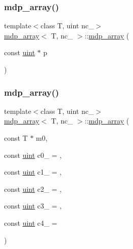 \subsubsection{\texorpdfstring{mdp\+\_\+array()}{mdp\_array()}\hspace{0.1cm}{\footnotesize\ttfamily [2/5]}}
{\footnotesize\ttfamily template$<$class T, uint nc\+\_\+$>$ \\
\hyperlink{classmdp__array}{mdp\+\_\+array}$<$ T, nc\+\_\+ $>$\+::\hyperlink{classmdp__array}{mdp\+\_\+array} (\begin{DoxyParamCaption}\item[{const \hyperlink{mdp__global__vars_8h_a91ad9478d81a7aaf2593e8d9c3d06a14}{uint} $\ast$}]{p }\end{DoxyParamCaption})\hspace{0.3cm}{\ttfamily [inline]}}

\mbox{\label{classmdp__array_abf3b0ca804544eac3be7d8e499eeb089}} 
\subsubsection{\texorpdfstring{mdp\+\_\+array()}{mdp\_array()}\hspace{0.1cm}{\footnotesize\ttfamily [3/5]}}
{\footnotesize\ttfamily template$<$class T, uint nc\+\_\+$>$ \\
\hyperlink{classmdp__array}{mdp\+\_\+array}$<$ T, nc\+\_\+ $>$\+::\hyperlink{classmdp__array}{mdp\+\_\+array} (\begin{DoxyParamCaption}\item[{const T $\ast$}]{m0,  }\item[{const \hyperlink{mdp__global__vars_8h_a91ad9478d81a7aaf2593e8d9c3d06a14}{uint}}]{c0\+\_\+ = {},  }\item[{const \hyperlink{mdp__global__vars_8h_a91ad9478d81a7aaf2593e8d9c3d06a14}{uint}}]{c1\+\_\+ = {},  }\item[{const \hyperlink{mdp__global__vars_8h_a91ad9478d81a7aaf2593e8d9c3d06a14}{uint}}]{c2\+\_\+ = {},  }\item[{const \hyperlink{mdp__global__vars_8h_a91ad9478d81a7aaf2593e8d9c3d06a14}{uint}}]{c3\+\_\+ = {},  }\item[{const \hyperlink{mdp__global__vars_8h_a91ad9478d81a7aaf2593e8d9c3d06a14}{uint}}]{c4\+\_\+ = {} }\end{DoxyParamCaption})\hspace{0.3cm}{\ttfamily [inline]}}

